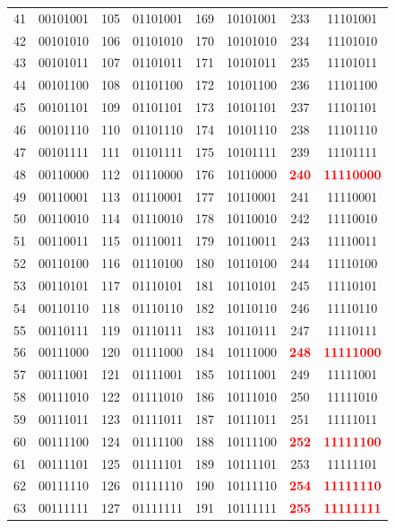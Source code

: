 \documentclass[a4paper,12pt]{report}
\begin{document}
{\begin{center}
\begin{tabular}{|c|c||c|c||c|c||c|c|}
41 & 00101001 & 105 & 01101001 & 169 & 10101001 & 233 & 11101001 \\
42 & 00101010 & 106 & 01101010 & 170 & 10101010 & 234 & 11101010 \\
43 & 00101011 & 107 & 01101011 & 171 & 10101011 & 235 & 11101011 \\
44 & 00101100 & 108 & 01101100 & 172 & 10101100 & 236 & 11101100 \\
45 & 00101101 & 109 & 01101101 & 173 & 10101101 & 237 & 11101101 \\
46 & 00101110 & 110 & 01101110 & 174 & 10101110 & 238 & 11101110 \\
47 & 00101111 & 111 & 01101111 & 175 & 10101111 & 239 & 11101111 \\
48 & 00110000 & 112 & 01110000 & 176 & 10110000 & \textbf{\textcolor{red}{240}} & \textbf{\textcolor{red}{11110000}} \\
49 & 00110001 & 113 & 01110001 & 177 & 10110001 & 241 & 11110001 \\
50 & 00110010 & 114 & 01110010 & 178 & 10110010 & 242 & 11110010 \\
51 & 00110011 & 115 & 01110011 & 179 & 10110011 & 243 & 11110011 \\
52 & 00110100 & 116 & 01110100 & 180 & 10110100 & 244 & 11110100 \\
53 & 00110101 & 117 & 01110101 & 181 & 10110101 & 245 & 11110101 \\
54 & 00110110 & 118 & 01110110 & 182 & 10110110 & 246 & 11110110 \\
55 & 00110111 & 119 & 01110111 & 183 & 10110111 & 247 & 11110111 \\
56 & 00111000 & 120 & 01111000 & 184 & 10111000 & \textbf{\textcolor{red}{248}} & \textbf{\textcolor{red}{11111000}} \\
57 & 00111001 & 121 & 01111001 & 185 & 10111001 & 249 & 11111001 \\
58 & 00111010 & 122 & 01111010 & 186 & 10111010 & 250 & 11111010 \\
59 & 00111011 & 123 & 01111011 & 187 & 10111011 & 251 & 11111011 \\
60 & 00111100 & 124 & 01111100 & 188 & 10111100 & \textbf{\textcolor{red}{252}} & \textbf{\textcolor{red}{11111100}} \\
61 & 00111101 & 125 & 01111101 & 189 & 10111101 & 253 & 11111101 \\
62 & 00111110 & 126 & 01111110 & 190 & 10111110 & \textbf{\textcolor{red}{254}} & \textbf{\textcolor{red}{11111110}} \\
63 & 00111111 & 127 & 01111111 & 191 & 10111111 & \textbf{\textcolor{red}{255}} & \textbf{\textcolor{red}{11111111}} \\ 
\hline
\end{tabular}
\end{center}
} %
\end{document}
